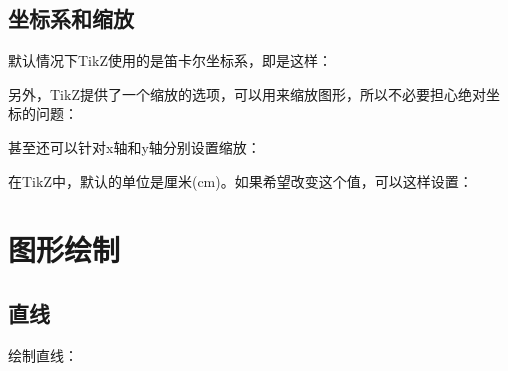 \documentclass[12pt]{article}
\begin{document}
\subsection{坐标系和缩放}\label{ux5750ux6807ux7cfbux548cux7f29ux653e}

默认情况下TikZ使用的是笛卡尔坐标系，即是这样：

另外，TikZ提供了一个缩放的选项，可以用来缩放图形，所以不必要担心绝对坐标的问题：

\begin{Shaded}
\begin{Highlighting}[]
\NormalTok{\{}\NormalTok{\}[scale=0.5]}
\end{Highlighting}
\end{Shaded}

甚至还可以针对x轴和y轴分别设置缩放：

\begin{Shaded}
\begin{Highlighting}[]
\NormalTok{\{}\NormalTok{\}[xscale=0.5, yscale=0.3]}
\end{Highlighting}
\end{Shaded}

在TikZ中，默认的单位是厘米(cm)。如果希望改变这个值，可以这样设置：

\begin{Shaded}
\begin{Highlighting}[]
\NormalTok{\{}\NormalTok{\}[x=2cm,y=1.5cm]}

\NormalTok{\{}\NormalTok{\}[x=\{(2cm,0cm)\},y=\{(0cm,1.5cm)\}]}
\end{Highlighting}
\end{Shaded}

\section{图形绘制}\label{ux56feux5f62ux7ed8ux5236}

\subsection{直线}\label{ux76f4ux7ebf}

绘制直线：

\begin{Shaded}
\begin{Highlighting}[]
\end{Highlighting}
\end{Shaded}
\end{document}
